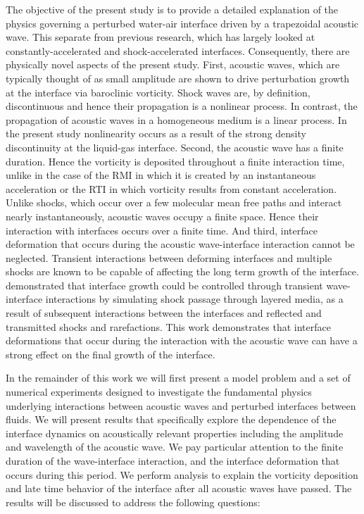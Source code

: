 \documentclass{article}
\begin{document}
The objective of the present study is to provide a detailed
explanation of the physics governing a perturbed water-air interface
driven by a trapezoidal acoustic wave. This separate from previous
research, which has largely looked at constantly-accelerated and
shock-accelerated interfaces. Consequently, there are physically novel
aspects of the present study.  First, acoustic waves, which are
typically thought of as small amplitude are shown to drive
perturbation growth at the interface via baroclinic vorticity. Shock
waves are, by definition, discontinuous and hence their propagation is
a nonlinear process. In contrast, the propagation of acoustic waves in
a homogeneous medium is a linear process. In the present study
nonlinearity occurs as a result of the strong density discontinuity at
the liquid-gas interface. Second, the acoustic wave has a finite
duration. Hence the vorticity is deposited throughout a finite
interaction time, unlike in the case of the \ac{RMI} in which it is
created by an instantaneous acceleration or the \ac{RTI} in which
vorticity results from constant acceleration. Unlike shocks, which
occur over a few molecular mean free paths and interact nearly
instantaneously, acoustic waves occupy a finite space. Hence their
interaction with interfaces occurs over a finite time. And third,
interface deformation that occurs during the acoustic wave-interface
interaction cannot be neglected. Transient interactions between
deforming interfaces and multiple shocks are known to be capable of
affecting the long term growth of the
interface. \cite{HenrydeFrahan2015b} demonstrated that interface
growth could be controlled through transient wave-interface
interactions by simulating shock passage through layered media, as a
result of subsequent interactions between the interfaces and reflected
and transmitted shocks and rarefactions. This work demonstrates that
interface deformations that occur during the interaction with the
acoustic wave can have a strong effect on the final growth of the
interface.

In the remainder of this work we will first present a model problem
and a set of numerical experiments designed to investigate the
fundamental physics underlying interactions between acoustic waves and
perturbed interfaces between fluids. We will present results that
specifically explore the dependence of the interface dynamics on
acoustically relevant properties including the amplitude and
wavelength of the acoustic wave. We pay particular attention to the
finite duration of the wave-interface interaction, and the interface
deformation that occurs during this period. We perform analysis to
explain the vorticity deposition and late time behavior of the
interface after all acoustic waves have passed. The results will be
discussed to address the following questions:
\end{document}
